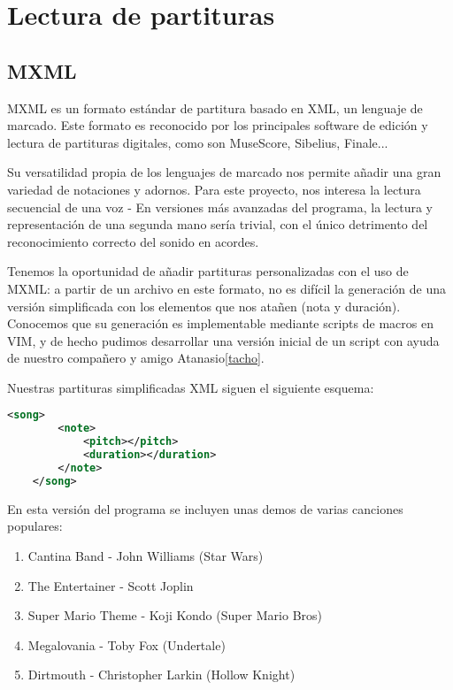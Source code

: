 \section{Lectura de partituras}
\subsection{MXML}
MXML es un formato estándar de partitura basado en XML, un lenguaje de marcado. Este formato es reconocido
por los principales software de edición y lectura de partituras digitales, como son MuseScore, Sibelius, Finale...

Su versatilidad propia de los lenguajes de marcado nos permite añadir una gran variedad de notaciones y adornos. Para este proyecto,
nos interesa la lectura secuencial de una voz - En versiones más avanzadas del programa, la lectura y representación de una segunda mano 
sería trivial, con el único detrimento del reconocimiento correcto del sonido en acordes. 

Tenemos la oportunidad de añadir partituras personalizadas con el uso de MXML: a partir de un archivo en este formato, no es 
difícil la generación de una versión simplificada con los elementos que nos atañen (nota y duración). Conocemos que su generación es 
implementable mediante scripts de macros en VIM, y de hecho pudimos desarrollar una versión inicial de un script con ayuda de
nuestro compañero y amigo Atanasio\ref{tacho}.

Nuestras partituras simplificadas XML siguen el siguiente esquema:

\begin{lstlisting}[language=xml]
    <song>
        <note>
            <pitch></pitch>
            <duration></duration>
        </note>
    </song>
\end{lstlisting} 

En esta versión del programa se incluyen unas demos de varias canciones populares:
\begin{enumerate} 
	\item Cantina Band - John Williams (Star Wars)
    \item The Entertainer - Scott Joplin
    \item Super Mario Theme - Koji Kondo (Super Mario Bros)
    \item Megalovania - Toby Fox (Undertale)
    \item Dirtmouth - Christopher Larkin (Hollow Knight)
\end{enumerate}